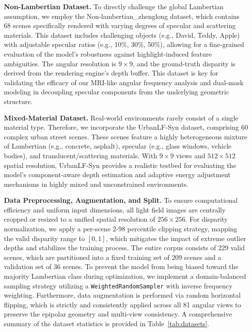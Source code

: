 \documentclass[lettersize,journal]{IEEEtran}
\begin{document}
\textbf{Non-Lambertian Dataset.} To directly challenge the global Lambertian assumption, we employ the Non-lambertian\_zhenglong \cite{zheng2020non} dataset, which contains 68 scenes specifically rendered with varying degrees of specular and scattering materials. This dataset includes challenging objects (e.g., David, Teddy, Apple) with adjustable specular ratios (e.g., 10\%, 30\%, 50\%), allowing for a fine-grained evaluation of the model's robustness against highlight-induced feature ambiguities. The angular resolution is $9 \times 9$, and the ground-truth disparity is derived from the rendering engine's depth buffer. This dataset is key for validating the efficacy of our MRI-like angular frequency analysis and dual-mask modeling in decoupling specular components from the underlying geometric structure.

\textbf{Mixed-Material Dataset.} Real-world environments rarely consist of a single material type. Therefore, we incorporate the UrbanLF-Syn \cite{meng2021urbanlf} dataset, comprising 60 complex urban street scenes. These scenes feature a highly heterogeneous mixture of Lambertian (e.g., concrete, asphalt), specular (e.g., glass windows, vehicle bodies), and translucent/scattering materials. With $9 \times 9$ views and $512 \times 512$ spatial resolution, UrbanLF-Syn provides a realistic testbed for evaluating the model's component-aware depth estimation and adaptive energy adjustment mechanisms in highly mixed and unconstrained environments.

\textbf{Data Preprocessing, Augmentation, and Split.} To ensure computational efficiency and uniform input dimensions, all light field images are centrally cropped or resized to a unified spatial resolution of $256 \times 256$. For disparity normalization, we apply a per-scene 2-98 percentile clipping strategy, mapping the valid disparity range to $[0, 1]$, which mitigates the impact of extreme outlier depths and stabilizes the training process. The entire corpus consists of 229 valid scenes, which are partitioned into a fixed training set of 209 scenes and a validation set of 36 scenes. To prevent the model from being biased toward the majority Lambertian class during optimization, we implement a domain-balanced sampling strategy utilizing a \texttt{WeightedRandomSampler} with inverse frequency weighting. Furthermore, data augmentation is performed via random horizontal flipping, which is strictly and consistently applied across all 81 angular views to preserve the epipolar geometry and multi-view consistency. A comprehensive summary of the dataset statistics is provided in Table~\ref{tab:datasets}.
\end{document}

